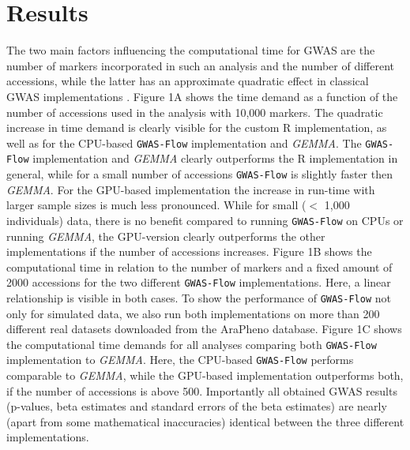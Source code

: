 \section{Results}

The two main factors influencing the computational time for GWAS are the number of markers incorporated in such an analysis and
the number of different accessions, while the latter has an approximate quadratic effect in classical GWAS implementations \cite{Zhou2012}.  
Figure 1A shows the time demand as a function of the number of accessions used in the analysis with 10,000 markers. The quadratic increase
in time demand is clearly visible for the custom R implementation, as well as for the CPU-based \texttt{GWAS-Flow} implementation and
\textit{GEMMA}. The \texttt{GWAS-Flow} implementation and \textit{GEMMA} clearly outperforms the R implementation in general, while
for a small number of accessions \texttt{GWAS-Flow} is slightly faster then \textit{GEMMA}. For the GPU-based implementation the increase
in run-time with larger sample sizes is much less pronounced. While for small ($<$ 1,000 individuals) data, there is no benefit compared
to running \texttt{GWAS-Flow} on CPUs or running \textit{GEMMA}, the GPU-version clearly outperforms the other implementations if the
number of accessions increases. Figure 1B shows the computational time in relation to the number of markers and a fixed amount of 2000
accessions for the two different \texttt{GWAS-Flow} implementations. Here, a linear relationship is visible in both cases.
To show the performance of \texttt{GWAS-Flow} not only for simulated data, we also run both implementations on more than 200 different
real datasets downloaded from the AraPheno database. Figure 1C shows the computational time demands for all analyses comparing both
\texttt{GWAS-Flow} implementation to \textit{GEMMA}. Here, the CPU-based \texttt{GWAS-Flow} performs comparable to \textit{GEMMA},
while the GPU-based implementation outperforms both, if the number of accessions is above 500. Importantly all obtained GWAS results
(p-values, beta estimates and standard errors of the beta estimates) are nearly (apart from some mathematical inaccuracies) identical
between the three different implementations.
